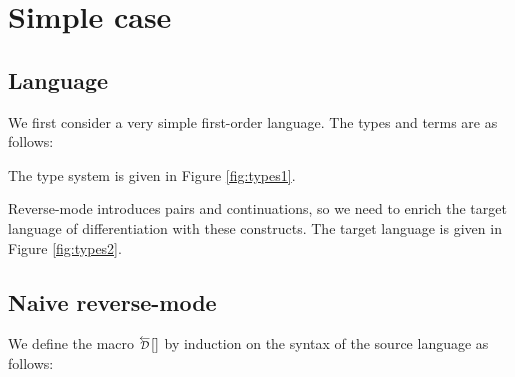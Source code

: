 \section{Simple case}

\subsection{Language}

We first consider a very simple first-order language. The types and terms are as follows:
 

The type system is given in Figure \ref{fig:types1}.


Reverse-mode introduces pairs and continuations, so we need to enrich the target language of differentiation with these constructs.
The target language is given in Figure \ref{fig:types2}.


\subsection{Naive reverse-mode}

We define the macro $\Dsynrevsymbol[][]{}$ by induction on the syntax of the source language as follows:


